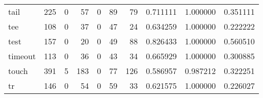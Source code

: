 \begin{longtable}{lrrrrrrrrr}
tail      &                                                225 &                                                  0 &                                                 57 &                                                  0 &                                                 89 &                                                 79 &                                           0.711111 &                               1.000000 &                             0.351111 \\
tee       &                                                108 &                                                  0 &                                                 37 &                                                  0 &                                                 47 &                                                 24 &                                           0.634259 &                               1.000000 &                             0.222222 \\
test      &                                                157 &                                                  0 &                                                 20 &                                                  0 &                                                 49 &                                                 88 &                                           0.826433 &                               1.000000 &                             0.560510 \\
timeout   &                                                113 &                                                  0 &                                                 36 &                                                  0 &                                                 43 &                                                 34 &                                           0.665929 &                               1.000000 &                             0.300885 \\
touch     &                                                391 &                                                  5 &                                                183 &                                                  0 &                                                 77 &                                                126 &                                           0.586957 &                               0.987212 &                             0.322251 \\
tr        &                                                146 &                                                  0 &                                                 54 &                                                  0 &                                                 59 &                                                 33 &                                           0.621575 &                               1.000000 &                             0.226027 \\

\end{longtable}
